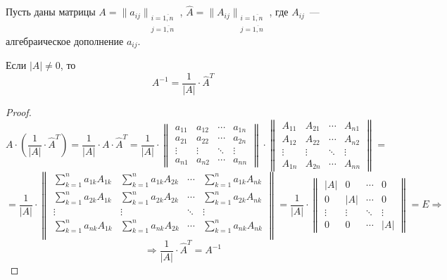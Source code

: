 \begin{theorem}
\label{th:inverse_matrix_by_matrix_of_cofactors}
Пусть даны матрицы $A = \|a_{ij}\|_{\begin{smallmatrix}
i = \overline{1, n} \\
j = \overline{1, n}
\end{smallmatrix}}$, $\hat A = \|A_{ij}\|_{\begin{smallmatrix}
i = \overline{1, n} \\
j = \overline{1, n}
\end{smallmatrix}}$, где $A_{ij}$~--- алгебраическое дополнение $a_{ij}$.

Если $|A| \neq 0$, то
\begin{equation*}
A^{-1} = \frac1{|A|} \cdot \hat A^T
\end{equation*}
\end{theorem}
\begin{proof}
\begin{equation*}
A \cdot \left( \frac1{|A|} \cdot \hat A^T \right) =
\frac1{|A|} \cdot A \cdot \hat A^T =
\frac1{|A|} \cdot
\begin{Vmatrix}
a_{11} & a_{12} & \cdots & a_{1n} \\
a_{21} & a_{22} & \cdots & a_{2n} \\
\vdots & \vdots & \ddots & \vdots \\
a_{n1} & a_{n2} & \cdots & a_{nn}
\end{Vmatrix} \cdot
\begin{Vmatrix}
A_{11} & A_{21} & \cdots & A_{n1} \\
A_{12} & A_{22} & \cdots & A_{n2} \\
\vdots & \vdots & \ddots & \vdots \\
A_{1n} & A_{2n} & \cdots & A_{nn}
\end{Vmatrix} =
\end{equation*}
\begin{equation*}
= \frac1{|A|} \cdot
\begin{Vmatrix}
\sum\limits_{k=1}^n a_{1k} A_{1k} & \sum\limits_{k=1}^n a_{1k} A_{2k} & \cdots & \sum\limits_{k=1}^n a_{1k} A_{nk} \\
\sum\limits_{k=1}^n a_{2k} A_{1k} & \sum\limits_{k=1}^n a_{2k} A_{2k} & \cdots & \sum\limits_{k=1}^n a_{2k} A_{nk} \\
\vdots & \vdots & \ddots & \vdots \\
\sum\limits_{k=1}^n a_{nk} A_{1k} & \sum\limits_{k=1}^n a_{nk} A_{2k} & \cdots & \sum\limits_{k=1}^n a_{nk} A_{nk} \\
\end{Vmatrix} =
\frac1{|A|} \cdot
\begin{Vmatrix}
|A| & 0 & \cdots & 0 \\
0 & |A| & \cdots & 0 \\
\vdots & \vdots & \ddots & \vdots \\
0 & 0 & \cdots & |A|
\end{Vmatrix} = E \Rightarrow
\end{equation*}
\begin{equation*}
\Rightarrow \frac1{|A|} \cdot \hat A^T = A^{-1}
\end{equation*}
\end{proof}

